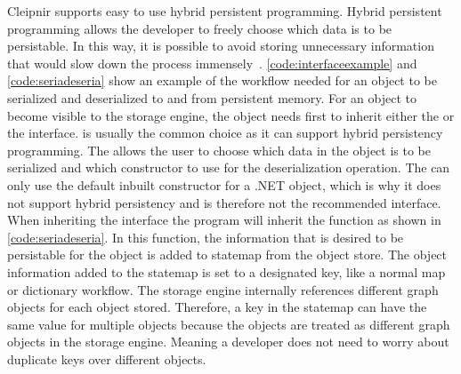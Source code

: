 Cleipnir supports easy to use hybrid persistent programming. Hybrid persistent programming allows the developer to freely choose which data is to be persistable. In this way, it is possible to avoid storing unnecessary information that would slow down the process immensely~\cite[p.~9-10]{PAPER:PaxosCleipnir}. \autoref{code:interfaceexample} and \autoref{code:seriadeseria} show an example of the workflow needed for an object to be serialized and deserialized to and from persistent memory. For an object to become visible to the storage engine, the object needs first to inherit either the  or the  interface.  is usually the common choice as it can support hybrid persistency programming. The  allows the user to choose which data in the object is to be serialized and which constructor to use for the deserialization operation. The  can only use the default inbuilt constructor for a .NET object, which is why it does not support hybrid persistency and is therefore not the recommended interface.
When inheriting the  interface the program will inherit the  function as shown in \autoref{code:seriadeseria}. In this function,  the information that is desired to be persistable for the object is added to statemap from the object store. The object information added to the statemap is set to a designated key, like a normal map or dictionary workflow. The storage engine internally references different graph objects for each object stored. Therefore, a key in the statemap can have the same value for multiple objects because the objects are treated as different graph objects in the storage engine. Meaning a developer does not need to worry about duplicate keys over different objects.

